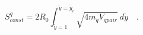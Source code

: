 \begin{equation}
S^q_{const}=2
R_0\int^{\tilde{y}=\tilde{y}_c}_{\tilde{y}=1}\sqrt{4 m_q
V_{qpair}}~d\tilde{y}\quad.
\end{equation}

